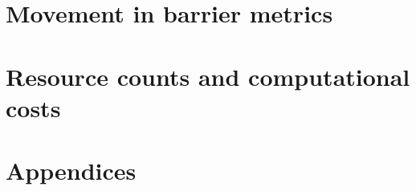 \documentclass[11pt]{article}
\begin{document}
\part{Movement in barrier metrics}\label{part:movement}




\clearpage
\part{Resource counts and computational costs}\label{part:computation}






\clearpage
\appendix
\part*{Appendices}




\clearpage
{}
{}


\end{document}
